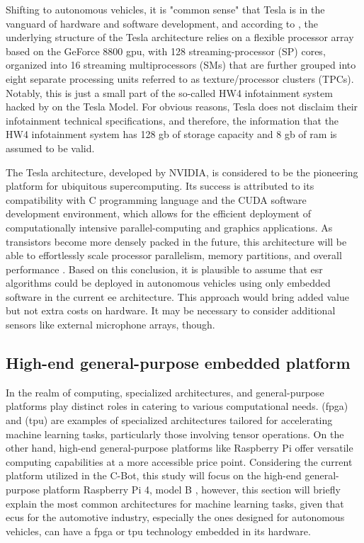 Shifting to autonomous vehicles, it is "common sense" that Tesla is in the vanguard of hardware and software development, and according to \textcite{Lindholm2008}, the underlying structure of the Tesla architecture relies on a flexible processor array based on the GeForce 8800 \gls{gpu}, with 128 streaming-processor (SP) cores, organized into 16 streaming multiprocessors (SMs) that are further grouped into eight separate processing units referred to as texture/processor clusters (TPCs). Notably, this is just a small part of the so-called HW4 infotainment system hacked by \textcite{Teslanorth2023} on the Tesla Model. For obvious reasons, Tesla does not disclaim their infotainment technical specifications, and therefore, the information that the HW4 infotainment system has 128 \gls{g}\gls{b} of storage capacity and 8 \gls{g}\gls{b} of \gls{ram} is assumed to be valid.

The Tesla architecture, developed by NVIDIA, is considered to be the pioneering platform for ubiquitous supercomputing. Its success is attributed to its compatibility with C programming language and the CUDA software development environment, which allows for the efficient deployment of computationally intensive parallel-computing and graphics applications. As transistors become more densely packed in the future, this architecture will be able to effortlessly scale processor parallelism, memory partitions, and overall performance \cite{Lindholm2008}. Based on this conclusion, it is plausible to assume that \gls{esr} algorithms could be deployed in autonomous vehicles using only embedded software in the current \gls{ee} architecture. This approach would bring added value but not extra costs on hardware. It may be necessary to consider additional sensors like external microphone arrays, though.


\subsection{High-end general-purpose embedded platform}
\label{subsec:ECU_high-end-platform}

In the realm of computing, specialized architectures, and general-purpose platforms play distinct roles in catering to various computational needs.  (\gls{fpga}) and  (\gls{tpu}) are examples of specialized architectures tailored for accelerating machine learning tasks, particularly those involving tensor operations. On the other hand, high-end general-purpose platforms like Raspberry Pi offer versatile computing capabilities at a more accessible price point. Considering the current platform utilized in the C-Bot, this study will focus on the high-end general-purpose platform Raspberry Pi 4, model B \cite{Raspberry2023}, however, this section will briefly explain the most common architectures for machine learning tasks, given that \gls{ecu}s for the automotive industry, especially the ones designed for autonomous vehicles, can have a \gls{fpga} or \gls{tpu} technology embedded in its hardware.

